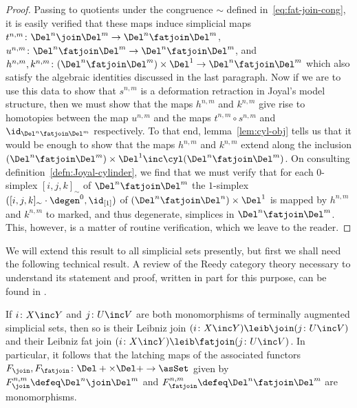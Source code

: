 \begin{proof}
    Passing to quotients under the congruence $\sim$ defined in~\eqref{eq:fat-join-cong}, it is easily verified that these maps induce simplicial maps $t^{n,m}\colon\Del^n\join\Del^m\to\Del^n\fatjoin\Del^m$, $u^{n,m}\colon\Del^n\fatjoin\Del^m\to\Del^n\fatjoin\Del^m$, and $h^{n,m}, k^{n,m}\colon(\Del^n\fatjoin\Del^m)\times\Del^1\to\Del^n\fatjoin\Del^m$ which also satisfy the algebraic identities discussed in the last paragraph. Now if we are to use this data to show that $s^{n,m}$ is a deformation retraction in Joyal's model structure, then we must show that the maps $h^{n,m}$ and $k^{n,m}$ give rise to homotopies between the map $u^{n,m}$ and the maps $t^{n,m}\circ s^{n,m}$ and $\id_{\Del^n\fatjoin\Del^m}$ respectively. To that end, lemma~\ref{lem:cyl-obj} tells us that it would be enough to show that the maps $h^{n,m}$ and $k^{n,m}$ extend along the inclusion $(\Del^n\fatjoin\Del^m)\times\Del^1\inc\cyl(\Del^n\fatjoin\Del^m)$. On consulting definition~\ref{defn:Joyal-cylinder}, we find that we must verify that for each $0$-simplex $[{i},{j},{k}]_\sim$ of $\Del^n\fatjoin\Del^m$ the $1$-simplex $([{i},{j},{k}]_\sim\cdot\degen^0,\id_{[1]})$ of $(\Del^n\fatjoin\Del^n)\times\Del^1$ is mapped by $h^{n,m}$ and $k^{n,m}$ to marked, and thus degenerate, simplices in $\Del^n\fatjoin\Del^m$. This, however, is a matter of routine verification, which we leave to the reader.
  \end{proof}
  
  
  
  We will extend this result to all simplicial sets presently, but first we shall need the following technical result. A review of the Reedy category theory necessary to understand its statement and proof, written in part for this purpose, can be found in \cite{RiehlVerity:2013kx}.
  
  \begin{lem}\label{lem:cofib-joins}
    If $i\colon X\inc Y$ and $j\colon U\inc V$ are both monomorphisms of terminally augmented simplicial sets, then so is their Leibniz join $(i\colon X\inc Y)\leib\join(j\colon U\inc V)$ and their Leibniz fat join $(i\colon X\inc Y)\leib\fatjoin(j\colon U\inc V)$. In particular, it follows that the latching maps of the associated functors $F_{\join},F_{\fatjoin}\colon \Del+\times\Del+\to\asSet$ given by $F_{\join}^{n,m} \defeq \Del^n\join\Del^m$ and $F_{\fatjoin}^{n,m} \defeq \Del^n\fatjoin\Del^m$ are  monomorphisms.
  \end{lem}
  
